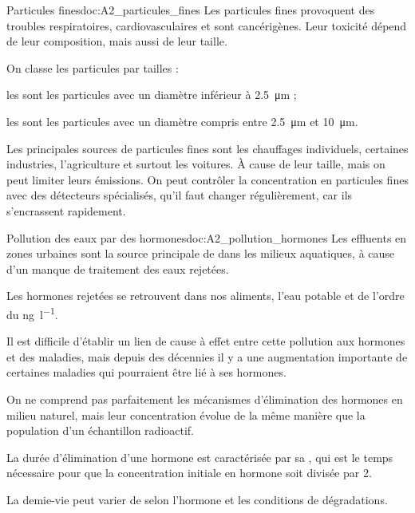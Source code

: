 \begin{doc}{Particules fines}{doc:A2_particules_fines}
  Les particules fines provoquent des troubles respiratoires, cardiovasculaires et sont cancérigènes.
  Leur toxicité dépend de leur composition, mais aussi de leur taille. 

  \begin{encart}
    On classe les particules par tailles :
    \begin{listePoints}
      \item les  sont les particules avec un diamètre inférieur à \qty{2,5}{\micro\m} ;
      \item les  sont les particules avec un diamètre compris entre \qty{2,5}{\micro\m} et \qty{10}{\micro\m}.
    \end{listePoints}
  \end{encart}

  Les principales sources de particules fines sont les chauffages individuels, certaines industries, l'agriculture et surtout les voitures.
  À cause de leur taille,  mais on peut limiter leurs émissions.
  On peut contrôler la concentration en particules fines avec des détecteurs spécialisés, qu'il faut changer régulièrement, car ils s'encrassent rapidement.
\end{doc}

\begin{doc}{Pollution des eaux par des hormones}{doc:A2_pollution_hormones}
  Les effluents en zones urbaines sont la source principale de  dans les milieux aquatiques, à cause d'un manque de traitement des eaux rejetées.

  \begin{encart}
    Les hormones rejetées se retrouvent dans nos aliments, l'eau potable et  de l'ordre du \unit{\nano\g\per\litre}.
  \end{encart}
  Il est difficile d'établir un lien de cause à effet entre cette pollution aux hormones et des maladies, mais depuis des décennies il y a une augmentation importante de certaines maladies qui pourraient être lié à ses hormones.

  On ne comprend pas parfaitement les mécanismes d'élimination des hormones en milieu naturel, mais leur concentration évolue de la même manière que la population d'un échantillon radioactif.
  \begin{encart}
    La durée d'élimination d'une hormone est caractérisée par sa , qui est le temps nécessaire pour que la concentration initiale en hormone soit divisée par 2.
  \end{encart}
  
  La demie-vie peut varier de  selon l'hormone et les conditions de dégradations.
\end{doc}

